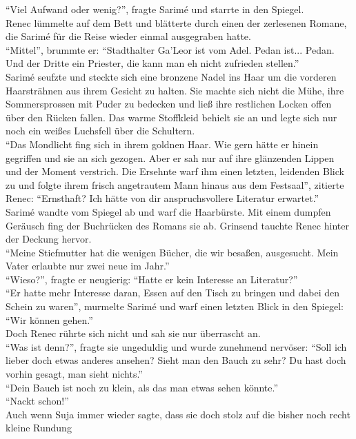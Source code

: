 ``Viel Aufwand oder wenig?'', fragte Sarimé und starrte in den Spiegel.\\
Renec lümmelte auf dem Bett und blätterte durch einen der zerlesenen Romane, die Sarimé für die 
Reise wieder einmal ausgegraben hatte.\\
``Mittel'', brummte er: ``Stadthalter Ga'Leor ist vom Adel. Pedan ist... Pedan. Und der Dritte ein 
Priester, die kann man eh nicht zufrieden stellen.''\\
Sarimé seufzte und steckte sich eine bronzene Nadel ins Haar um die vorderen Haarsträhnen aus ihrem 
Gesicht zu halten. Sie machte sich nicht die Mühe, ihre Sommersprossen mit Puder zu bedecken und 
ließ ihre restlichen Locken offen über den Rücken fallen. Das warme Stoffkleid behielt sie an und 
legte sich nur noch ein weißes Luchsfell über die Schultern.\\
``Das Mondlicht fing sich in ihrem goldnen Haar. Wie gern hätte er hinein gegriffen und sie an sich 
gezogen. Aber er sah nur auf ihre glänzenden Lippen und der Moment verstrich. Die Ersehnte warf ihm 
einen letzten, leidenden Blick zu und folgte ihrem frisch angetrautem Mann hinaus aus dem 
Festsaal'', zitierte Renec: ``Ernsthaft? Ich hätte von dir anspruchsvollere Literatur erwartet.''\\
Sarimé wandte vom Spiegel ab und warf die Haarbürste. Mit einem dumpfen Geräusch fing der Buchrücken des Romans sie ab. 
Grinsend tauchte Renec hinter der Deckung hervor.\\
``Meine Stiefmutter hat die wenigen Bücher, die wir besaßen, ausgesucht. Mein Vater erlaubte nur 
zwei neue im Jahr.''\\
``Wieso?'', fragte er neugierig: ``Hatte er kein Interesse an Literatur?''\\
``Er hatte mehr Interesse daran, Essen auf den Tisch zu bringen und dabei den Schein zu waren'', 
murmelte Sarimé und warf einen letzten Blick in den Spiegel: ``Wir können gehen.''\\
Doch Renec rührte sich nicht und sah sie nur überrascht an.\\
``Was ist denn?'', fragte sie ungeduldig und wurde zunehmend nervöser: ``Soll ich lieber doch etwas 
anderes ansehen? Sieht man den Bauch zu sehr? Du hast doch vorhin gesagt, man sieht nichts.''\\
``Dein Bauch ist noch zu klein, als das man etwas sehen könnte.''\\
``Nackt schon!''\\
Auch wenn Suja immer wieder sagte, dass sie doch stolz auf die bisher noch recht kleine Rundung 
